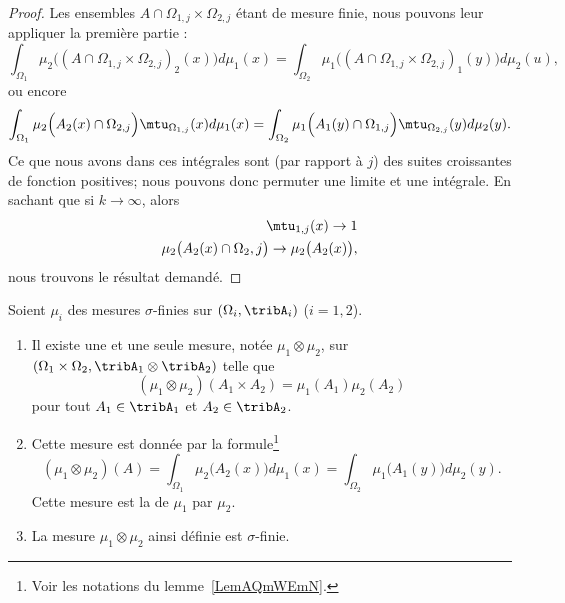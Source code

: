 \begin{proof}
									Les ensembles \( A\cap \Omega_{1,j}\times \Omega_{2,j}\) étant de mesure finie, nous pouvons leur appliquer la première partie :
									\begin{equation}
									\int_{\Omega_1}\mu_2\Big( (A\cap\Omega_{1,j}\times \Omega_{2,j})_2(x) \Big)d\mu_1(x)=\int_{\Omega_2}\mu_1\Big( (A\cap\Omega_{1,j}\times \Omega_{2,j})_1(y) \Big)d\mu_2(u),
									\end{equation}
									ou encore
									\begin{equation}
									\int_{\Omega_1}\mu_2\Big( A_2(x)\cap \Omega_{2,j} \Big)\mtu_{\Omega_{1,j}}(x)d\mu_1(x)=\int_{\Omega_2}\mu_1\Big( A_1(y)\cap \Omega_{1,j} \Big)\mtu_{\Omega_{2,j}}(y)d\mu_2(y).
									\end{equation}
									Ce que nous avons dans ces intégrales sont (par rapport à \( j\)) des suites croissantes de fonction positives; nous pouvons donc permuter une limite et une intégrale. En sachant que si \( k\to \infty\), alors
									\begin{subequations}
									\begin{align}
									\mtu_{1,j}(x)\to 1 \\
										\mu_2\big( A_2(x)\cap \Omega_2,j \big)\to\mu_2\big( A_2(x) \big),
									\end{align}
									\end{subequations}
									nous trouvons le résultat demandé.
									\end{proof}

									\begin{theoremDef}[\cite{FubiniBMauray,MesIntProbb}]   \label{ThoWWAjXzi}
									Soient \( \mu_i\) des mesures \( \sigma\)-finies sur \( (\Omega_i,\tribA_i)\) (\( i=1,2\)).
									\begin{enumerate}
									\item

									Il existe une et une seule mesure, notée \( \mu_1\otimes \mu_2\), sur \( (\Omega_1\times\Omega_2,\tribA_1\otimes\tribA_2)\) telle que
									\begin{equation}    \label{EqOIuWLQU}
(\mu_1\otimes\mu_2)(A_1\times A_2)=\mu_1(A_1)\mu_2(A_2)
	\end{equation}
	pour tout \( A_1\in \tribA_1\) et \( A_2\in\tribA_2\).
	\item
	Cette mesure est donnée par la formule\footnote{Voir les notations du lemme~\ref{LemAQmWEmN}.}
	\begin{equation}   \label{EqDFxuGtH}
	(\mu_1\otimes \mu_2)(A)=\int_{\Omega_1}\mu_2\big( A_2(x) \big)d\mu_1(x)=\int_{\Omega_2}\mu_1\big( A_1(y) \big)d\mu_2(y).
	\end{equation}
	Cette mesure est la  de \( \mu_1\) par \( \mu_2\).
	\item
	La mesure \( \mu_1\otimes \mu_2\) ainsi définie est \( \sigma\)-finie.
	\end{enumerate}
	\end{theoremDef}

